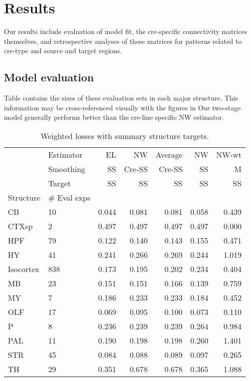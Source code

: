 
\section{Results}

Our results include evaluation of model fit, the cre-specific connectivity matrices themselves, and retrospective analyses of these matrices for  patterns related to cre-type and source and target regions.

\subsection{Model evaluation}
\label{sec:model_eval}

Table  contains the sizes of these evaluation sets in each major structure.
This information may be cross-referenced visually with the figures in 
Our two-stage model generally performs better than the cre-line specific NW estimator.

\newpage 
\begin{table}[H]
\begin{adjustbox}{width=.5\columnwidth,center}

\begin{tabular}{ll|rrrrr}
\toprule
   & Estimator &     EL &     NW & Average &     NW &  NW-wt \\
   & Smoothing &     SS & Cre-SS &  Cre-SS &     SS &      M \\
   & Target &     SS &     SS &      SS &     SS &     SS \\
Structure & \# Eval exps &        &        &         &        &        \\
\midrule
\hline
CB & 10 &  0.044 &  0.081 &   0.081 &  0.058 &  0.439 \\
CTXsp & 2 &  0.497 &  0.497 &   0.497 &  0.497 &  0.000 \\
HPF & 79 &  0.122 &  0.140 &   0.143 &  0.155 &  0.471 \\
HY & 41 &  0.241 &  0.266 &   0.269 &  0.244 &  1.019 \\
Isocortex & 838 &  0.173 &  0.195 &   0.202 &  0.234 &  0.404 \\
MB & 23 &  0.151 &  0.151 &   0.166 &  0.139 &  0.759 \\
MY & 7 &  0.186 &  0.233 &   0.233 &  0.184 &  0.452 \\
OLF & 17 &  0.069 &  0.095 &   0.100 &  0.073 &  0.110 \\
P & 8 &  0.236 &  0.239 &   0.239 &  0.264 &  0.984 \\
PAL & 11 &  0.190 &  0.198 &   0.198 &  0.260 &  1.401 \\
STR & 45 &  0.084 &  0.088 &   0.089 &  0.097 &  0.265 \\
TH & 29 &  0.351 &  0.678 &   0.678 &  0.365 &  1.088 \\
\bottomrule
\end{tabular}
\end{adjustbox}
\caption{Weighted losses with summary structure targets.}
\end{table}


